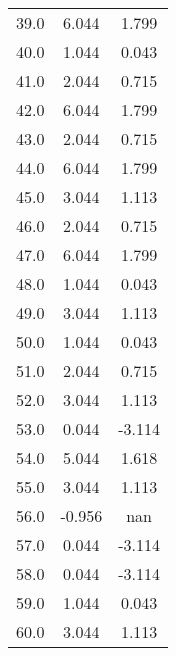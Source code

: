 \begin{table}
\begin{tabular}{ccc}
39.0 & 6.044 & 1.799 \\
40.0 & 1.044 & 0.043 \\
41.0 & 2.044 & 0.715 \\
42.0 & 6.044 & 1.799 \\
43.0 & 2.044 & 0.715 \\
44.0 & 6.044 & 1.799 \\
45.0 & 3.044 & 1.113 \\
46.0 & 2.044 & 0.715 \\
47.0 & 6.044 & 1.799 \\
48.0 & 1.044 & 0.043 \\
49.0 & 3.044 & 1.113 \\
50.0 & 1.044 & 0.043 \\
51.0 & 2.044 & 0.715 \\
52.0 & 3.044 & 1.113 \\
53.0 & 0.044 & -3.114 \\
54.0 & 5.044 & 1.618 \\
55.0 & 3.044 & 1.113 \\
56.0 & -0.956 & nan \\
57.0 & 0.044 & -3.114 \\
58.0 & 0.044 & -3.114 \\
59.0 & 1.044 & 0.043 \\
60.0 & 3.044 & 1.113 \\
\end{tabular}
\end{table}
